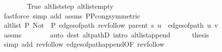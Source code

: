 \begin{isabellebody}
\ \ \ \ \ \ \isamarkupfalse%
\ True\ alt{\isacharunderscore}{\kern0pt}list{\isacharunderscore}{\kern0pt}step\ alt{\isacharunderscore}{\kern0pt}list{\isacharunderscore}{\kern0pt}empty\isanewline
\ \ \ \ \ \ \isamarkupfalse%
\ {\isacharparenleft}{\kern0pt}fastforce\ simp\ add{\isacharcolon}{\kern0pt}\ assms{\isacharparenleft}{\kern0pt}{}{\isacharparenright}{\kern0pt}\ P{\isacharunderscore}{\kern0pt}P{\isacharprime}{\kern0pt}{\isacharprime}{\kern0pt}{\isacharunderscore}{\kern0pt}cong{\isacharbrackleft}{\kern0pt}symmetric{\isacharbrackright}{\kern0pt}{\isacharparenright}{\kern0pt}\isanewline
\ \ \ \ \isamarkupfalse%
\ \isamarkupfalse%
\ {\isachardoublequoteopen}alt{\isacharunderscore}{\kern0pt}list\ P{\isacharprime}{\kern0pt}{\isacharprime}{\kern0pt}\ {\isacharparenleft}{\kern0pt}Not\ {\isasymcirc}\ P{\isacharprime}{\kern0pt}{\isacharprime}{\kern0pt}{\isacharparenright}{\kern0pt}\ {\isacharparenleft}{\kern0pt}edges{\isacharunderscore}{\kern0pt}of{\isacharunderscore}{\kern0pt}path\ {\isacharparenleft}{\kern0pt}rev{\isacharunderscore}{\kern0pt}follow\ {\isacharparenleft}{\kern0pt}parent\ s{\isacharparenright}{\kern0pt}\ u{\isacharparenright}{\kern0pt}\ {\isacharat}{\kern0pt}\ edges{\isacharunderscore}{\kern0pt}of{\isacharunderscore}{\kern0pt}path\ {\isacharbrackleft}{\kern0pt}u{\isacharcomma}{\kern0pt}\ v{\isacharbrackright}{\kern0pt}{\isacharparenright}{\kern0pt}{\isachardoublequoteclose}\isanewline
\ \ \ \ \ \ \isamarkupfalse%
\ assms{\isacharparenleft}{\kern0pt}{}{\isacharparenright}{\kern0pt}\isanewline
\ \ \ \ \ \ \isamarkupfalse%
\ {\isacharparenleft}{\kern0pt}auto\ dest{\isacharcolon}{\kern0pt}\ alt{\isacharunderscore}{\kern0pt}pathD{\isacharparenleft}{\kern0pt}{}{\isacharparenright}{\kern0pt}\ intro{\isacharcolon}{\kern0pt}\ alt{\isacharunderscore}{\kern0pt}list{\isacharunderscore}{\kern0pt}append{\isacharunderscore}{\kern0pt}{}{\isacharprime}{\kern0pt}{\isacharparenright}{\kern0pt}\isanewline
\ \ \ \ \isamarkupfalse%
\ {\isacharquery}{\kern0pt}thesis\isanewline
\ \ \ \ \ \ \isamarkupfalse%
\ {\isacharparenleft}{\kern0pt}simp\ add{\isacharcolon}{\kern0pt}\ rev{\isacharunderscore}{\kern0pt}follow{\isacharparenleft}{\kern0pt}{}{\isacharparenright}{\kern0pt}\ edges{\isacharunderscore}{\kern0pt}of{\isacharunderscore}{\kern0pt}path{\isacharunderscore}{\kern0pt}append{\isacharunderscore}{\kern0pt}{}{\isacharbrackleft}{\kern0pt}OF\ rev{\isacharunderscore}{\kern0pt}follow{\isacharparenleft}{\kern0pt}{}{\isacharparenright}{\kern0pt}{\isacharbrackright}{\kern0pt}{\isacharparenright}{\kern0pt}\isanewline

\end{isabellebody}
